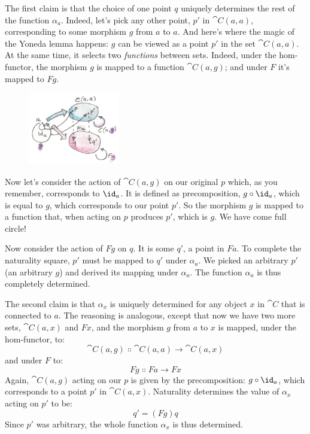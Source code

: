 \noindent
The first claim is that the choice of one point $q$ uniquely
determines the rest of the function $\alpha_a$. Indeed, let's pick any
other point, $p'$ in $\cat{C}(a, a)$, corresponding to
some morphism $g$ from $a$ to $a$. And here's where
the magic of the Yoneda lemma happens: $g$ can be viewed as a
point $p'$ in the set $\cat{C}(a, a)$. At the same time,
it selects two \emph{functions} between sets. Indeed, under the
hom-functor, the morphism $g$ is mapped to a function
$\cat{C}(a, g)$; and under $F$ it's mapped to $F g$.

\begin{figure}[H]
\centering
\includegraphics[width=40mm]{images/yoneda4.png}
\end{figure}

\noindent
Now let's consider the action of $\cat{C}(a, g)$ on our original
$p$ which, as you remember, corresponds to $\id_a$. It is
defined as precomposition, $g \circ \id_a$, which is equal to $g$,
which corresponds to our point $p'$. So the morphism
$g$ is mapped to a function that, when acting on $p$
produces $p'$, which is $g$. We have come full
circle!

Now consider the action of $F g$ on $q$. It is some
$q'$, a point in $F a$. To complete the naturality
square, $p'$ must be mapped to $q'$ under
$\alpha_a$. We picked an arbitrary $p'$ (an arbitrary
$g$) and derived its mapping under $\alpha_a$. The function
$\alpha_a$ is thus completely determined.

The second claim is that $\alpha_x$ is uniquely determined for any
object $x$ in $\cat{C}$ that is connected to $a$. The
reasoning is analogous, except that now we have two more sets,
$\cat{C}(a, x)$ and $F x$, and the morphism $g$ from
$a$ to $x$ is mapped, under the hom-functor, to:
\[\cat{C}(a, g) \Colon \cat{C}(a, a) \to \cat{C}(a, x)\]
and under $F$ to:
\[F g \Colon F a \to F x\]
Again, $\cat{C}(a, g)$ acting on our $p$ is given by the
precomposition: $g \circ \id_a$, which corresponds to a point
$p'$ in $\cat{C}(a, x)$. Naturality determines the value
of $\alpha_x$ acting on $p'$ to be:
\[q' = (F g) q\]
Since $p'$ was arbitrary, the whole function $\alpha_x$ is
thus determined.

